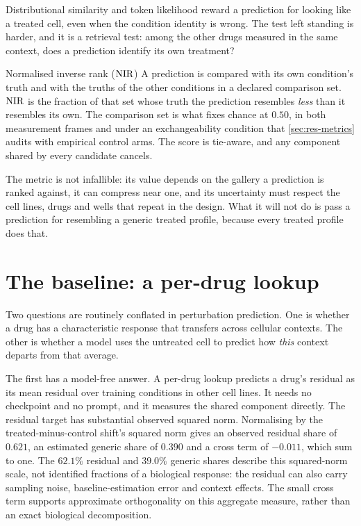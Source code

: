 Distributional similarity and token likelihood reward a prediction for looking
like a treated cell, even when the condition identity is wrong. The test left
standing is harder, and it is a retrieval test: among the other drugs measured
in the same context, does a prediction identify its own treatment?

\begin{defn}{Normalised inverse rank ($\textrm{NIR}$)}
A prediction is compared with its own condition's truth and with the truths of
the other conditions in a declared comparison set. $\textrm{NIR}$ is the fraction of that
set whose truth the prediction resembles \emph{less} than it resembles its own.
The comparison set is what fixes chance at $0.50$, in both measurement frames and
under an exchangeability condition that \cref{sec:res-metrics} audits with
empirical control arms. The score is tie-aware, and any component shared by every
candidate cancels.
\end{defn}

The metric is not infallible: its value depends on the gallery a prediction is
ranked against, it can compress near one, and its uncertainty must respect the
cell lines, drugs and wells that repeat in the design. What it will not do is
pass a prediction for resembling a generic treated profile, because every
treated profile does that.

\section{The baseline: a per-drug lookup}
\label{sec:intro-bar}

Two questions are routinely conflated in perturbation prediction. One is whether
a drug has a characteristic response that transfers across cellular contexts.
The other is whether a model uses the untreated cell to predict how \emph{this}
context departs from that average.

The first has a model-free answer. A per-drug lookup predicts a
drug's residual as its mean residual over training conditions in other cell
lines. It needs no checkpoint and no prompt, and it measures the shared
component directly. The residual target has
substantial observed squared norm. Normalising by the treated-minus-control
shift's squared norm gives an observed residual share of $0.621$, an estimated
generic share of $0.390$ and a cross term of $-0.011$, which sum to one. The
$62.1\%$ residual and $39.0\%$ generic shares describe this squared-norm scale,
not identified fractions of a biological response: the residual can also carry
sampling noise, baseline-estimation error and context effects. The small cross
term supports approximate orthogonality on this aggregate measure, rather than
an exact biological decomposition.

